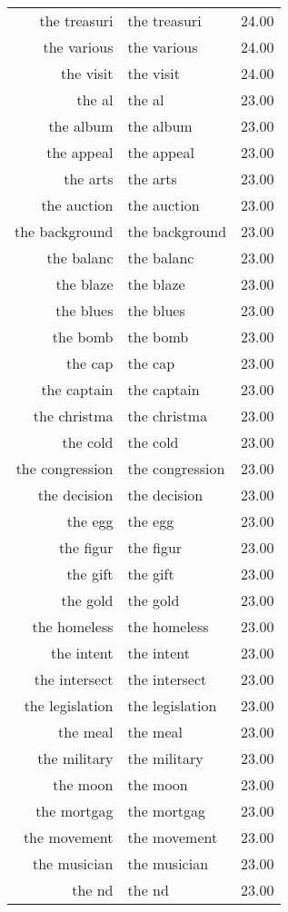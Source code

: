 \begin{table}[ht]
\begin{tabular}{rlr}
  the treasuri & the treasuri & 24.00 \\ 
  the various & the various & 24.00 \\ 
  the visit & the visit & 24.00 \\ 
  the al & the al & 23.00 \\ 
  the album & the album & 23.00 \\ 
  the appeal & the appeal & 23.00 \\ 
  the arts & the arts & 23.00 \\ 
  the auction & the auction & 23.00 \\ 
  the background & the background & 23.00 \\ 
  the balanc & the balanc & 23.00 \\ 
  the blaze & the blaze & 23.00 \\ 
  the blues & the blues & 23.00 \\ 
  the bomb & the bomb & 23.00 \\ 
  the cap & the cap & 23.00 \\ 
  the captain & the captain & 23.00 \\ 
  the christma & the christma & 23.00 \\ 
  the cold & the cold & 23.00 \\ 
  the congression & the congression & 23.00 \\ 
  the decision & the decision & 23.00 \\ 
  the egg & the egg & 23.00 \\ 
  the figur & the figur & 23.00 \\ 
  the gift & the gift & 23.00 \\ 
  the gold & the gold & 23.00 \\ 
  the homeless & the homeless & 23.00 \\ 
  the intent & the intent & 23.00 \\ 
  the intersect & the intersect & 23.00 \\ 
  the legislation & the legislation & 23.00 \\ 
  the meal & the meal & 23.00 \\ 
  the military & the military & 23.00 \\ 
  the moon & the moon & 23.00 \\ 
  the mortgag & the mortgag & 23.00 \\ 
  the movement & the movement & 23.00 \\ 
  the musician & the musician & 23.00 \\ 
  the nd & the nd & 23.00 \\ 

\end{tabular}
\end{table}
